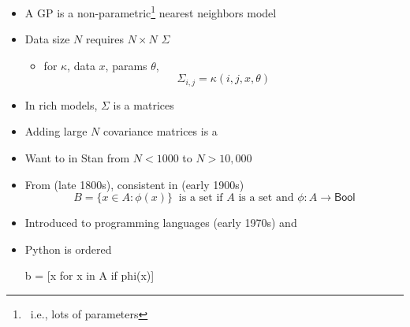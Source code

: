 \documentclass[9pt]{report}
\begin{document}

\begin{itemize}
\item A GP is a non-parametric\footnote{\sf \null \ i.e., lots of parameters} nearest neighbors model
\item Data size $N$ requires $N \times N$  $\Sigma$
  \begin{itemize}
  \item for  $\kappa$, data $x$, params $\theta$,
    \[
      \Sigma_{i,j} = \kappa(i, j, x, \theta)
    \]
  \end{itemize}
\item In rich models, $\Sigma$ is a  matrices
\item Adding large $N$ covariance matrices is a 
\item Want to  in Stan from $N < 1000$ to $N > 10,000$
\end{itemize}



\begin{itemize}
\item From  (late 1800s), consistent in  (early 1900s)
  \[
    B = \{ x \in A : \phi(x) \} \ \textrm{ is a set if } A \textrm{ is a
      set and } \phi : A \rightarrow \textsf{Bool}
  \]
\item Introduced to programming languages (early 1970s) and
\item Python  is ordered
\begin{stancode}
b = [x for x in A if phi(x)]
\end{stancode}
\end{itemize}
\end{document}
